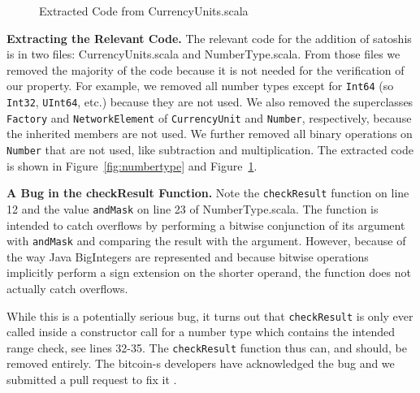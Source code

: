 \documentclass[runningheads]{llncs}
\renewcommand{\paragraph}{\textbf}%
\begin{document}
\begin{figure}

  \caption{Extracted Code from CurrencyUnits.scala}
  \label{fig:currencyunits}
\end{figure}

\paragraph{Extracting the Relevant Code.} The relevant code for the
addition of satoshis is in two files: CurrencyUnits.scala and
NumberType.scala. From those files we removed the majority of the code
because it is not needed for the verification of our property. For
example, we removed all number types except for \texttt{Int64} (so
\texttt{Int32}, \texttt{UInt64}, etc.) because they are not used. We
also removed the superclasses \texttt{Factory} and
\texttt{NetworkElement} of \texttt{CurrencyUnit} and \texttt{Number},
respectively, because the inherited members are not used. We further
removed all binary operations on \texttt{Number} that are not used,
like subtraction and multiplication. The extracted code is shown in
Figure~\ref{fig:numbertype} and Figure~\ref{fig:currencyunits}.

\paragraph{A Bug in the checkResult Function.} Note the
\texttt{checkResult} function on line 12 and the value
\texttt{andMask} on line 23 of NumberType.scala. The function is
intended to catch overflows by performing a bitwise conjunction of its
argument with \texttt{andMask} and comparing the result with the
argument. However, because of the way Java BigIntegers are represented
\cite{wikipedia:twocomp} and because bitwise operations implicitly
perform a sign extension \cite{java:bigint} on the shorter operand,
the function does not actually catch overflows.

While this is a potentially serious bug, it turns out that
\texttt{checkResult} is only ever called inside a constructor call for
a number type which contains the intended range check, see lines
32-35. The \texttt{checkResult} function thus can, and should, be
removed entirely. The bitcoin-s developers have acknowledged the bug
and we submitted a pull request to fix it \cite{BitcoinS:pull565}.

\end{document}
